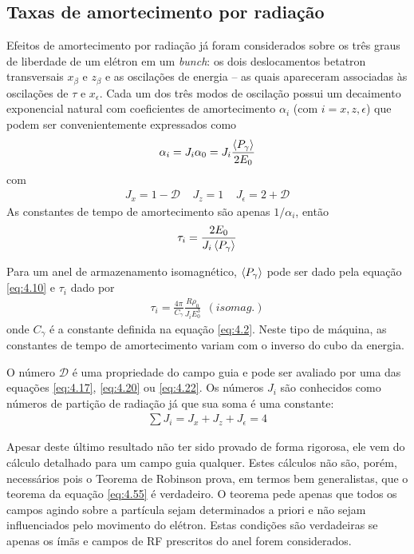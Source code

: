\subsection{Taxas de amortecimento por radiação}\label{sec:4.4}
Efeitos de amortecimento por radiação já foram considerados sobre os três graus de liberdade de um elétron em um \textit{bunch}: os dois deslocamentos betatron transversais $x_\beta$ e $z_\beta$ e as oscilações de energia -- as quais apareceram associadas às oscilações de $\tau$ e $x_\epsilon$. Cada um dos três modos de oscilação possui um decaimento exponencial natural com coeficientes de amortecimento $\alpha_i$ (com $i=x,z,\epsilon$) que podem ser convenientemente expressados como
\begin{align}
	\alpha_i = J_i \alpha_0 = J_i\frac{\left< P_\gamma \right>}{2E_0}
\end{align}
com
\begin{align}
	J_x=1-\mathscr{D}\ \ \ \ \ J_z=1\ \ \ \ \ J_\epsilon=2+\mathscr{D}\label{eq:4.52}
\end{align}
As constantes de tempo de amortecimento são apenas $1/\alpha_i$, então
\begin{align}
	\tau_i = \frac{2E_0}{J_i \left< P_\gamma \right>}
\end{align}

Para um anel de armazenamento isomagnético, $\left< P_\gamma \right>$ pode ser dado pela equação \eqref{eq:4.10} e $\tau_i$ dado por
\begin{align}
	\tau_i = \frac{4\pi}{C_\gamma}\frac{R\rho_0}{J_i E_0^3}\ \ (isomag.)
\end{align}
onde $C_\gamma$ é a constante definida na equação \eqref{eq:4.2}. Neste tipo de máquina, as constantes de tempo de amortecimento variam com o inverso do cubo da energia.

O número $\mathscr{D}$ é uma propriedade do campo guia e pode ser avaliado por uma das equações \eqref{eq:4.17}, \eqref{eq:4.20} ou \eqref{eq:4.22}. Os números $J_i$ são conhecidos como números de partição de radiação já que sua soma é uma constante:
\begin{align}
	\sum J_i = J_x + J_z + J_\epsilon = 4\label{eq:4.55}
\end{align}

Apesar deste último resultado não ter sido provado de forma rigorosa, ele vem do cálculo detalhado para um campo guia qualquer. Estes cálculos não são, porém, necessários pois o Teorema de Robinson prova, em termos bem generalistas, que o teorema da equação \eqref{eq:4.55} é verdadeiro. O teorema pede apenas que todos os campos agindo sobre a partícula sejam determinados a priori e não sejam influenciados pelo movimento do elétron. Estas condições são verdadeiras se apenas os ímãs e campos de RF prescritos do anel forem considerados.

